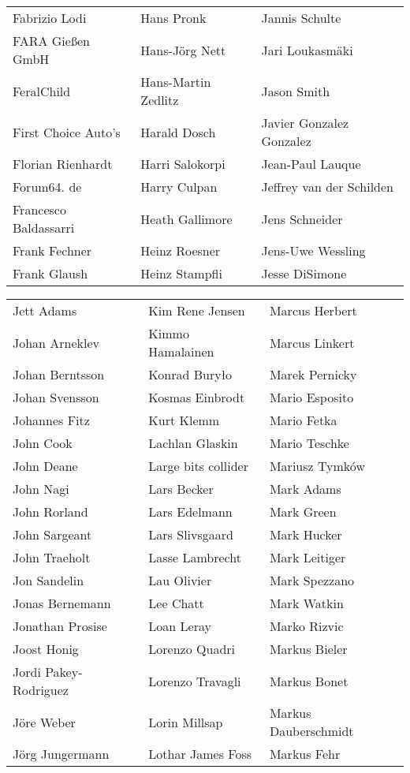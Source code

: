 \begin{small}
\begin{tabular}{p{4cm}p{4cm}p{4cm}}
Fabrizio Lodi & Hans Pronk & Jannis Schulte \\
FARA Gießen GmbH & Hans-Jörg Nett & Jari Loukasmäki \\
FeralChild & Hans-Martin Zedlitz & Jason Smith \\
First Choice Auto's & Harald Dosch & Javier Gonzalez Gonzalez \\
Florian Rienhardt & Harri Salokorpi & Jean-Paul Lauque \\
Forum64. de & Harry Culpan & Jeffrey van der Schilden \\
Francesco Baldassarri & Heath Gallimore & Jens Schneider \\
Frank Fechner & Heinz Roesner & Jens-Uwe Wessling \\
Frank Glaush & Heinz Stampfli & Jesse DiSimone \\
\end{tabular}
\newpage
\setlength{\tabcolsep}{1mm}
\begin{tabular}{p{4cm}p{4cm}p{4cm}}
Jett Adams & Kim Rene Jensen & Marcus Herbert \\
Johan Arneklev & Kimmo Hamalainen & Marcus Linkert \\
Johan Berntsson & Konrad Buryło & Marek Pernicky \\
Johan Svensson & Kosmas Einbrodt & Mario Esposito \\
Johannes Fitz & Kurt Klemm & Mario Fetka \\
John Cook & Lachlan Glaskin & Mario Teschke \\
John Deane & Large bits collider & Mariusz Tymków \\
John Nagi & Lars Becker & Mark Adams \\
John Rorland & Lars Edelmann & Mark Green \\
John Sargeant & Lars Slivsgaard & Mark Hucker \\
John Traeholt & Lasse Lambrecht & Mark Leitiger \\
Jon Sandelin & Lau Olivier & Mark Spezzano \\
Jonas Bernemann & Lee Chatt & Mark Watkin \\
Jonathan Prosise & Loan Leray & Marko Rizvic \\
Joost Honig & Lorenzo Quadri & Markus Bieler \\
Jordi Pakey-Rodriguez & Lorenzo Travagli & Markus Bonet \\
Jöre Weber & Lorin Millsap & Markus Dauberschmidt \\
Jörg Jungermann & Lothar James Foss & Markus Fehr \\

\end{tabular}
\end{small}

